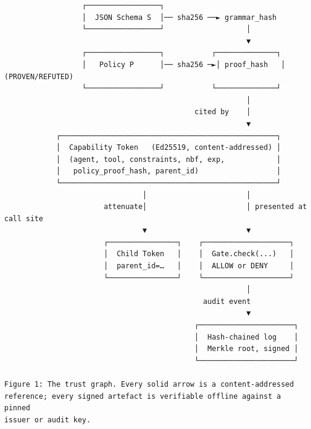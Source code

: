 \begin{verbatim}
                  ┌─────────────────┐
                  │  JSON Schema S  │── sha256 ──► grammar_hash
                  └─────────────────┘                   │
                                                        ▼
                  ┌─────────────────┐           ┌──────────────┐
                  │   Policy P      │── sha256 ─►│ proof_hash   │ (PROVEN/REFUTED)
                  └─────────────────┘           └──────────────┘
                                                        │
                                            cited by    │
                                                        ▼
            ┌──────────────────────────────────────────────────┐
            │  Capability Token   (Ed25519, content-addressed) │
            │  (agent, tool, constraints, nbf, exp,            │
            │   policy_proof_hash, parent_id)                  │
            └──────────────────────────────────────────────────┘
                                │                       │
                       attenuate│                       │ presented at call site
                                ▼                       ▼
                       ┌────────────────┐    ┌────────────────────┐
                       │  Child Token   │    │  Gate.check(...)   │
                       │  parent_id=…   │    │  ALLOW or DENY     │
                       └────────────────┘    └────────────────────┘
                                                        │
                                              audit event
                                                        ▼
                                            ┌──────────────────────┐
                                            │  Hash-chained log    │
                                            │  Merkle root, signed │
                                            └──────────────────────┘

Figure 1: The trust graph. Every solid arrow is a content-addressed
reference; every signed artefact is verifiable offline against a pinned
issuer or audit key.
\end{verbatim}
